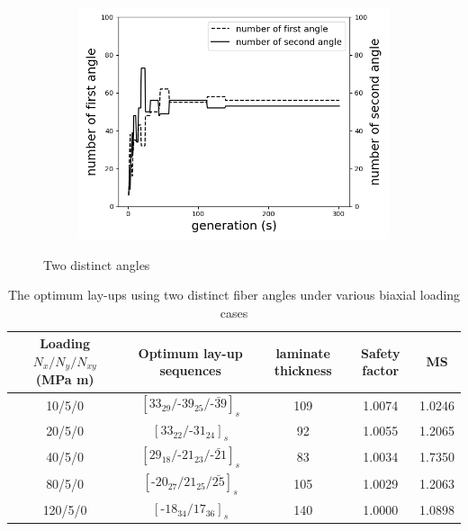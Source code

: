 \begin{figure}[!t]
		\begin{subfigure}[b]{0.8\linewidth}
			\includegraphics[width=\linewidth]{2020-11-10-pre-image/two_distinct_angler_number_change.png}
		\end{subfigure}
	\caption{Two distinct angles}
	\label{fig:two_angles}
\end{figure}

\begin{table}
	\normalsize
\caption{The optimum lay-ups using two distinct fiber angles under various biaxial loading cases}
\label{tab:two_distinct_angle}
\centering
\begin{tabular}{ccccc}
	\toprule
	Loading	$N_{x}/N_{y}/N_{xy}$ (MPa m)	       & Optimum lay-up sequences                                   & laminate thickness &  Safety factor  & MS\\
	\midrule
	10/5/0                                         &  $[33_{29}/\text{-}39_{25}/\bar{\text{-}39}]_s$            &     109               &  1.0074      &  1.0246  \\
	20/5/0                                         &  $[33_{22}/\text{-}31_{24}]_s$                             &     92               &  1.0055       &  1.2065    \\
	40/5/0                                         &  $[29_{18}/\text{-}21_{23}/\bar{\text{-}21}]_s$            &     83               &  1.0034       &  1.7350   \\
	80/5/0                                         &  $[\text{-}20_{27}/21_{25}/\bar{25}]_s$                    &     105               &  1.0029      &  1.2063    \\
	120/5/0                                         &  $[\text{-}18_{34}/17_{36}]_s$                            &     140               &  1.0000      &  1.0898    \\
	\bottomrule
\end{tabular}
\end{table}

